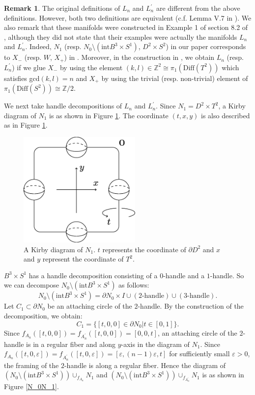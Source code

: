 \documentclass{amsart}
\theoremstyle{plain}
\theoremstyle{definition}
\newtheorem{rem}[thm]{Remark}
\begin{document}
\begin{rem}

The original definitions of $L_n$ and $L_n^\prime$ are different from the above definitions. 
However, both two definitions are equivalent (c.f. Lemma V.7 in \cite{Pao}). 
We also remark that these manifolds were constructed in Example 1 of section 8.2 of \cite{ADK}, 
although they did not state that their examples were actually the manifolds $L_n$ and $L_n^\prime$. 
Indeed, $N_1$ (resp. $N_0\setminus(\text{int}B^3\times S^1)$, $D^2\times S^2$) in our paper corresponds to $X_-$ (resp. $W$, $X_+$) in \cite{ADK}. 
Moreover, in the construction in \cite{ADK}, we obtain $L_n$ (resp. $L_n^\prime$) 
if we glue $X_-$ by using the element $(k,l)\in\mathbb{Z}^2\cong \pi_1(\text{Diff}(T^2))$ which satisfies gcd$(k,l)=n$ and $X_+$ by using the trivial (resp. non-trivial) element of $\pi_1(\text{Diff}(S^2))\cong \mathbb{Z}/2$. 

\end{rem}

We next take handle decompositions of $L_n$ and $L_n^\prime$. 
Since $N_1=D^2\times T^2$, a Kirby diagram of $N_1$ is as shown in Figure \ref{N_1}. 
The coordinate $(t,x,y)$ is also described as in Figure \ref{N_1}. 

\begin{figure}[htbp]
\begin{center}
\includegraphics[width=60mm]{N_1.eps}
\end{center}
\caption{A Kirby diagram of $N_1$. 
$t$ represents the coordinate of $\partial D^2$ and $x$ and $y$ represent the coordinate of $T^2$. }
\label{N_1}
\end{figure}

$B^3\times S^1$ has a handle decomposition consisting of a $0$-handle and a $1$-handle. 
So we can decompose $N_0\setminus(\text{int}B^3\times S^1)$ as follows: 
\[
N_0\setminus(\text{int}B^3\times S^1)=\partial N_0\times I\cup(2\text{-handle})\cup(3\text{-handle}). 
\]
Let $C_1\subset\partial N_0$ be an attaching circle of the $2$-handle. 
By the construction of the decomposition, we obtain: 
\[
C_1=\{[t,0,0]\in\partial N_0|t\in[0,1]\}. 
\]
Since $f_{A_n}([t,0,0])=f_{A_n^\prime}([t,0,0])=[0,0,t]$, an attaching circle of the $2$-handle is in a regular fiber and along $y$-axis in the diagram of $N_1$. 
Since $f_{A_n}([t,0,\varepsilon])=f_{A_n^\prime}([t,0,\varepsilon])=[\varepsilon,(n-1)\varepsilon,t]$ for sufficiently small $\varepsilon>0$, 
the framing of the $2$-handle is along a regular fiber. 
Hence the diagram of $(N_0\setminus(\text{int}B^3\times S^1))\cup_{f_{A_n}}N_1$ and $(N_0\setminus(\text{int}B^3\times S^1))\cup_{f_{A_n^\prime}}N_1$ is as shown in Figure \ref{N_0N_1}. 
\end{document}
